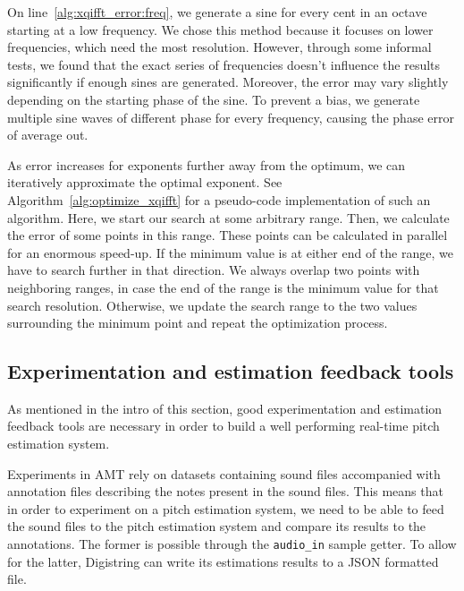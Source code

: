 \documentclass[a4paper,10pt,twocolumn]{article}
\begin{document}
On line~\ref{alg:xqifft_error:freq}, we generate a sine for every cent in an octave starting at a low frequency. We chose this method because it focuses on lower frequencies, which need the most resolution. However, through some informal tests, we found that the exact series of frequencies doesn't influence the results significantly if enough sines are generated. Moreover, the error may vary slightly depending on the starting phase of the sine. To prevent a bias, we generate multiple sine waves of different phase for every frequency, causing the phase error of average out.

As error increases for exponents further away from the optimum, we can iteratively approximate the optimal exponent. See Algorithm~\ref{alg:optimize_xqifft} for a pseudo-code implementation of such an algorithm. Here, we start our search at some arbitrary range. Then, we calculate the error of some points in this range. These points can be calculated in parallel for an enormous speed-up. If the minimum value is at either end of the range, we have to search further in that direction. We always overlap two points with neighboring ranges, in case the end of the range is the minimum value for that search resolution. Otherwise, we update the search range to the two values surrounding the minimum point and repeat the optimization process.



\subsection{Experimentation and estimation feedback tools}  \label{sub:tools}
As mentioned in the intro of this section, good experimentation and estimation feedback tools are necessary in order to build a well performing real-time pitch estimation system.

Experiments in AMT rely on datasets containing sound files accompanied with annotation files describing the notes present in the sound files. This means that in order to experiment on a pitch estimation system, we need to be able to feed the sound files to the pitch estimation system and compare its results to the annotations. The former is possible through the \texttt{audio\_in} sample getter. To allow for the latter, Digistring can write its estimations results to a JSON formatted file.
\end{document}
